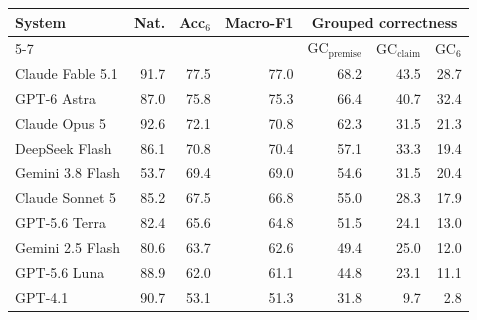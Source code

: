 \begin{tabularx}{\linewidth}{@{}Xrrr rrr@{}}
\toprule
System & Nat. & Acc$_6$ & Macro-F1 & \multicolumn{3}{c}{Grouped correctness}\\
\cmidrule(lr){5-7}
 & & & & GC$_{\mathrm{premise}}$ & GC$_{\mathrm{claim}}$ & GC$_6$\\
\midrule
Claude Fable 5.1 & 91.7 & 77.5 & 77.0 & 68.2 & 43.5 & 28.7\\
GPT-6 Astra & 87.0 & 75.8 & 75.3 & 66.4 & 40.7 & 32.4\\
Claude Opus 5 & 92.6 & 72.1 & 70.8 & 62.3 & 31.5 & 21.3\\
DeepSeek Flash & 86.1 & 70.8 & 70.4 & 57.1 & 33.3 & 19.4\\
Gemini 3.8 Flash & 53.7 & 69.4 & 69.0 & 54.6 & 31.5 & 20.4\\
Claude Sonnet 5 & 85.2 & 67.5 & 66.8 & 55.0 & 28.3 & 17.9\\
GPT-5.6 Terra & 82.4 & 65.6 & 64.8 & 51.5 & 24.1 & 13.0\\
Gemini 2.5 Flash & 80.6 & 63.7 & 62.6 & 49.4 & 25.0 & 12.0\\
GPT-5.6 Luna & 88.9 & 62.0 & 61.1 & 44.8 & 23.1 & 11.1\\
GPT-4.1 & 90.7 & 53.1 & 51.3 & 31.8 & 9.7 & 2.8\\
\bottomrule
\end{tabularx}
